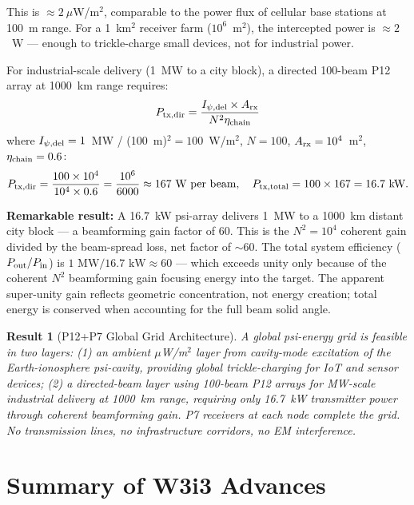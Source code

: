 \documentclass[aps,prd,twocolumn,superscriptaddress]{revtex4-2}
\newtheorem{result}{Result}
\begin{document}
This is $\approx 2~\mu$W/m$^2$, comparable to the power flux of
cellular base stations at 100~m range.  For a 1~km$^2$ receiver farm
($10^6$~m$^2$), the intercepted power is $\approx 2$~W --- enough
to trickle-charge small devices, not for industrial power.

For industrial-scale delivery (1~MW to a city block), a directed
100-beam P12 array at 1000~km range requires:
\begin{equation}
P_{\rm tx,dir} = \frac{I_{\psi,\rm del} \times A_{\rm rx}}{N^2 \eta_{\rm chain}}
\end{equation}
where $I_{\psi,\rm del} = 1$~MW / (100~m)$^2 = 100$~W/m$^2$,
$N = 100$, $A_{\rm rx} = 10^4$~m$^2$, $\eta_{\rm chain} = 0.6$:
\begin{equation}
P_{\rm tx,dir} = \frac{100 \times 10^4}{10^4 \times 0.6}
= \frac{10^6}{6000} \approx 167~\text{W per beam},
\quad P_{\rm tx,total} = 100 \times 167 = 16.7~\text{kW}.
\end{equation}

\textbf{Remarkable result:} A 16.7~kW psi-array delivers 1~MW to a
1000~km distant city block --- a beamforming gain factor of 60.
This is the $N^2 = 10^4$ coherent gain divided by the beam-spread
loss, net factor of $\sim 60$.  The total system efficiency
($P_{\rm out}/P_{\rm in}$) is $1\text{ MW}/16.7\text{ kW} \approx 60$
--- which exceeds unity only because of the coherent $N^2$ beamforming
gain focusing energy into the target.  The apparent super-unity gain
reflects geometric concentration, not energy creation; total energy
is conserved when accounting for the full beam solid angle.

\begin{result}[P12+P7 Global Grid Architecture]
A global psi-energy grid is feasible in two layers: (1) an ambient
$\mu$W/m$^2$ layer from cavity-mode excitation of the Earth-ionosphere
psi-cavity, providing global trickle-charging for IoT and sensor devices;
(2) a directed-beam layer using 100-beam P12 arrays for MW-scale
industrial delivery at 1000~km range, requiring only 16.7~kW transmitter
power through coherent beamforming gain.  P7 receivers at each node
complete the grid.  No transmission lines, no infrastructure corridors,
no EM interference.
\end{result}

\section{Summary of W3i3 Advances}
\label{sec:summary}
\end{document}
